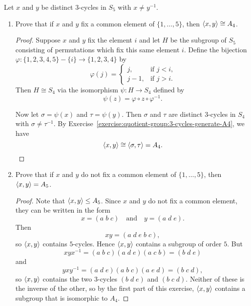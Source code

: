 \label{exercise:quotient-group:3-cycles-in-S5}
Let $x$ and $y$ be distinct $3$-cycles in $S_5$ with $x\neq y^{-1}$.
\begin{enumerate}
\item Prove that if $x$ and $y$ fix a common element of
  $\{1,\dots,5\}$, then $\langle{x,y}\rangle\cong A_4$.
  \begin{proof}
    Suppose $x$ and $y$ fix the element $i$ and let $H$ be the
    subgroup of $S_5$ consisting of permutations which fix this same
    element $i$. Define the bijection
    $\varphi\colon\{1,2,3,4,5\}-\{i\}\to\{1,2,3,4\}$ by
    \begin{equation*}
      \varphi(j) =
      \begin{cases}
        j, & \text{if $j < i$,} \\
        j - 1, & \text{if $j > i$.}
      \end{cases}
    \end{equation*}
    Then $H\cong S_4$ via the isomorphism $\psi\colon H\to S_4$
    defined by
    \begin{equation*}
      \psi(z) = \varphi\circ z\circ\varphi^{-1}.
    \end{equation*}

    Now let $\sigma = \psi(x)$ and $\tau = \psi(y)$. Then $\sigma$ and
    $\tau$ are distinct $3$-cycles in $S_4$ with
    $\sigma\neq\tau^{-1}$. By
    Exercise~\ref{exercise:quotient-group:3-cycles-generate-A4}, we
    have
    \begin{equation*}
      \langle{x,y}\rangle\cong\langle{\sigma,\tau}\rangle = A_4. \qedhere
    \end{equation*}
  \end{proof}
\item Prove that if $x$ and $y$ do not fix a common element of
  $\{1,\dots,5\}$, then $\langle{x,y}\rangle = A_5$.
  \begin{proof}
    Note that $\langle{x,y}\rangle\leq A_5$. Since $x$ and $y$ do not fix a
    common element, they can be written in the form
    \begin{equation*}
      x = (a\;b\;c) \quad\text{and}\quad
      y = (a\;d\;e).
    \end{equation*}
    Then
    \begin{equation*}
      xy = (a\;d\;e\;b\;c),
    \end{equation*}
    so $\langle{x,y}\rangle$ contains $5$-cycles. Hence $\langle{x,y}\rangle$ contains a
    subgroup of order $5$. But
    \begin{equation*}
      xyx^{-1} = (a\;b\;c)(a\;d\;e)(a\;c\;b)
      = (b\;d\;e)
    \end{equation*}
    and
    \begin{equation*}
      yxy^{-1} = (a\;d\;e)(a\;b\;c)(a\;e\;d)
      = (b\;c\;d),
    \end{equation*}
    so $\langle{x,y}\rangle$ contains the two $3$-cycles $(b\;d\;e)$ and
    $(b\;c\;d)$. Neither of these is the inverse of the other, so by
    the first part of this exercise, $\langle{x,y}\rangle$ contains a subgroup
    that is isomorphic to $A_4$.


\end{proof}
\end{enumerate}
